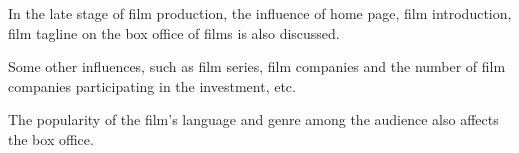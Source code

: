 In the late stage of film production, the influence of home page, film introduction, film tagline on the box office of films is also discussed.


Some other influences, such as film series, film companies and the number of film companies participating in the investment, etc.

The popularity of the film's language and genre among the audience also affects the box office.


